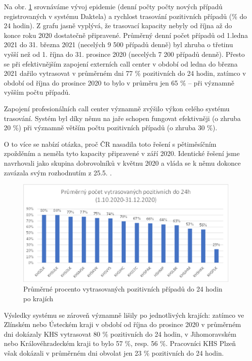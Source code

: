 Na obr. \ref{fig:pozitivni24_3} srovnáváme vývoj epidemie (denní počty počty nových případů registrovaných v systému Daktela) a rychlost trasování pozitivních případů (\% do 24 hodin). Z grafu jasně vyplývá, že trasovací kapacity nebyly od října až do konce roku 2020 dostatečně připravené. Průměrný denní počet případů od 1.ledna 2021 do 31. března 2021 (necelých 9 500 případů denně) byl zhruba o třetinu vyšší než od 1. října do 31. prosince 2020 (necelých 7 200 případů denně). Přesto se při efektivnějším zapojení externích call center v období od ledna do března 2021 dařilo vytrasovat v průměrném dni 77 \% pozitivních do 24 hodin, zatímco v období od října do prosince 2020 to bylo v průměru jen 65 \% -- při významně vyšším počtu případů.

Zapojení profesionálních call center významně zvýšilo výkon celého systému trasování. Systém byl díky němu na jaře schopen fungovat efektivněji (o zhruba 20 \%) při významně větším počtu pozitivních případů (o zhruba 30 \%).

O to více se nabízí otázka, proč ČR nasadila toto řešení s pětiměsíčním zpožděním a neměla tyto kapacity připravené v září 2020. Identické řešení jsme navrhovali jako skupina dobrovolníků v květnu 2020 \cite{tr_hlidac02} a vláda se k němu dokonce zavázala svým rozhodnutím z 25.5. \cite{tr_vlada01}.

\begin{figure}[ht]
    \centering
    \includegraphics[width=1\textwidth]{./pic/c.eps}
    \caption{Průměrné procento vytrasovaných pozitivních případů do 24 hodin po krajích}
    \label{fig:pozitivni24_3}
\end{figure}

Výsledky systému se zároveň významně lišily po jednotlivých krajích: zatímco ve Zlínském nebo Ústeckém kraji v období od října do prosince 2020 v průměrném dni dokázaly KHS vytrasovat 80 \% pozitivních do 24 hodin, v Jihomoravském nebo Královéhradeckém kraji to bylo 57 \%, resp. 56 \%. Pracovníci KHS Plzeň však dokázali v průměrném dni obvolat jen 23 \% pozitivních do 24 hodin.

